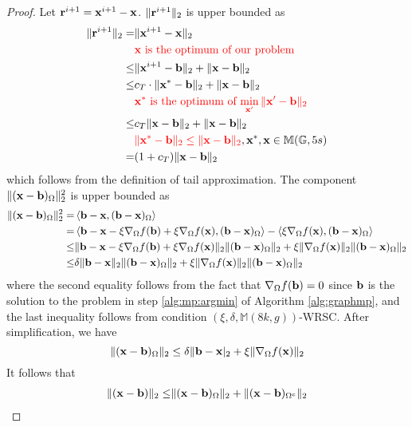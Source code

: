 \documentclass{article}
\begin{document}
\begin{proof}
Let ${\bf r}^{i+1}={\bf x}^{i+1}-{\bf x}$. $\|{\bf r}^{i+1}\|_2$ is upper bounded as
\begin{align*}
\|{\bf r}^{i+1}\|_2=&\|{\bf x}^{i+1}-{\bf x}\|_2\\
&\text{\color{red}{${\bf x}$ is the optimum of our problem}}\\
\leq&\|{\bf x}^{i+1}-{\bf b}\|_2+\|{\bf x}-{\bf b}\|_2\\
\leq&c_T\cdot\|{\bf x}^*-{\bf b}\|_2+\|{\bf x}-{\bf b}\|_2\\
&\text{\color{red}{${\bf x}^*$ is the optimum of $\min_{{\bf x}'}\|{\bf x}'-{\bf b}\|_2$}}\\ 
\leq&c_T\|{\bf x}-{\bf b}\|_2+\|{\bf x}-{\bf b}\|_2\\
&{\color{red}{\|{\bf x}^*-{\bf b}\|_2\leq\|{\bf x}-{\bf b}\|_2}}, {\bf x}^*, {\bf x}\in\mathbb{M}(\mathbb{G}, 5s)\\
=&(1+c_T)\|{\bf x}-{\bf b}\|_2
\end{align*}
which follows from the definition of tail approximation. The component $\|({\bf x}-{\bf b})_{\Omega}\|_2^2$ is upper bounded as
\begin{align*}
\|({\bf x}-{\bf b})_{\Omega}\|_2^2=&\left\langle {\bf b}-{\bf x},({\bf b}-{\bf x})_{\Omega} \right\rangle\\
=&\left\langle{\bf b}-{\bf x}-\xi\nabla_{\Omega} f({\bf b})+\xi\nabla_{\Omega}f({\bf x}),({\bf b}-{\bf x})_{\Omega} \right\rangle-\left\langle \xi\nabla_{\Omega}f({\bf x}), ({\bf b}-{\bf x})_{\Omega} \right\rangle\\
\leq&\|{\bf b}-{\bf x}-\xi\nabla_{\Omega} f({\bf b})+\xi\nabla_{\Omega} f({\bf x})\|_2\|({\bf b}-{\bf x})_{\Omega}\|_2+\xi\|\nabla_{\Omega} f({\bf x})\|_2\|({\bf b}-{\bf x})_{\Omega}\|_2\\
\leq&\delta\|{\bf b}-{\bf x}\|_2\|({\bf b}-{\bf x})_{\Omega}\|_2+\xi\|\nabla_{\Omega} f({\bf x})\|_2\|({\bf b}-{\bf x})_{\Omega}\|_2
\end{align*} 
where the second equality follows from the fact that $\nabla_{\Omega} f({\bf b})=0$ since ${\bf b}$ is the solution to the problem in step \ref{alg:mp:argmin} of Algorithm \ref{alg:graphmp}, and the last inequality follows from condition $(\xi,\delta,\mathbb{M}(8k,g))$-WRSC. After simplification, we have
\[
\|({\bf x}-{\bf b})_{\Omega}\|_2\leq\delta\|{\bf b}-{\bf x}|_2+\xi\|\nabla_{\Omega}f({\bf x})\|_2
\]
It follows that
\begin{align*}
\|({\bf x}-{\bf b})\|_2\leq&\|({\bf x}-{\bf b})_{\Omega}\|_2+\|({\bf x}-{\bf b})_{\Omega^c}\|_2\\

\end{align*}
\end{proof}
\end{document}
